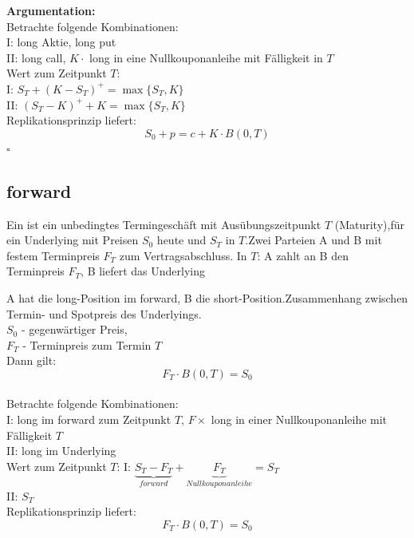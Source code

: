 \textbf{Argumentation:} \\
Betrachte folgende Kombinationen:\\
I: long Aktie, long put\\
II: long call, $K \cdot $ long in eine Nullkouponanleihe mit Fälligkeit in $T$\\

Wert zum Zeitpunkt $T$: \\
I: $S_T + (K-S_T)^+ = \max\{S_T,K\}$ \\
II: $(S_T - K)^+ + K = \max\{S_T,K\}$ \\

Replikationsprinzip liefert:
\[
	S_0 + p = c + K \cdot B(0,T)
\]
\hfill $\square$


\subsection{forward} %
\label{sub:forward}

Ein  ist ein unbedingtes Termingeschäft mit Ausübungszeitpunkt $T$ (Maturity),für ein Underlying mit Preisen $S_0$ heute und $S_T$ in $T$.Zwei Parteien A und B mit festem Terminpreis $F_T$ zum Vertragsabschluss. In $T$: A zahlt an B den Terminpreis $F_T$, B liefert das Underlying

A hat die long-Position im forward, B die short-Position.Zusammenhang zwischen Termin- und Spotpreis des Underlyings.\\
\hspace{2cm} $S_0$ - gegenwärtiger Preis, \\
\hspace{2cm} $F_T$ - Terminpreis zum Termin $T$\\
Dann gilt:
\[ F_T \cdot B(0,T) = S_0\]
\\
Betrachte folgende Kombinationen:\\
I: long im forward zum Zeitpunkt $T$, $F \times$ long in einer Nullkouponanleihe mit Fälligkeit $T$\\
II: long im Underlying\\
Wert zum Zeitpunkt $T$:
I: $\underbrace{S_T - F_T}_{forward} + \underbrace{F_T}_{Nullkouponanleihe} = S_T$\\
II: $S_T$\\
Replikationsprinzip liefert:
\[F_T \cdot B(0,T) = S_0 \]



